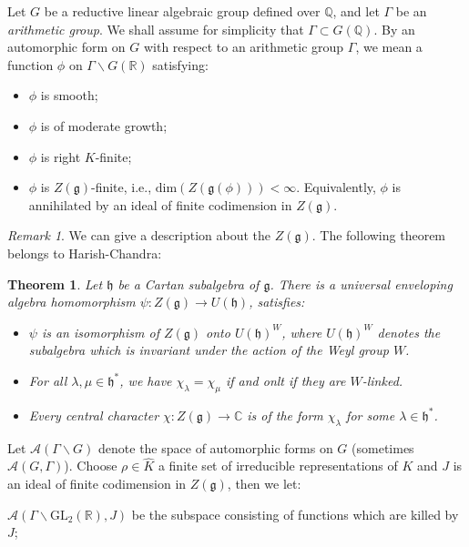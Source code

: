 \documentclass[11pt,english]{smfart}
\newtheorem{theorem}{Theorem}
\theoremstyle{definition}
\theoremstyle{remark}
\newtheorem*{remark}{Remark}
\begin{document}
Let $ G $ be a reductive linear algebraic group defined over $\mathbb{Q}$, and let $ \Gamma $ be an \textit{arithmetic group}. We shall assume for simplicity that $ \Gamma \subset G(\mathbb{Q}) $.
By an automorphic form on $ G $ with respect to an arithmetic group $ \Gamma $, we mean a function $ \phi $ on $ \Gamma \backslash G(\mathbb{R}) $ satisfying:
\begin{itemize}
    \item $\phi $ is smooth;
    \item $ \phi $ is of moderate growth;
    \item $ \phi $ is right $ K $-finite;
    \item $ \phi $ is $ Z(\mathfrak{g}) $-finite, i.e., $\mathrm{dim}(Z(\mathfrak{g}(\phi))) < \infty$. Equivalently, $\phi$ is annihilated by an ideal of finite codimension in $Z(\mathfrak{g})$.
\end{itemize}
\begin{remark}
    We can give a description about the $Z(\mathfrak{g})$. The following theorem belongs to Harish-Chandra:
    \begin{theorem}
        Let $\mathfrak{h}$ be a Cartan subalgebra of $\mathfrak{g}$. There is a universal enveloping algebra homomorphism $ \psi: Z(\mathfrak{g}) \rightarrow U(\mathfrak{h}) $, satisfies:
        \begin{itemize}
            \item $ \psi $ is an isomorphism of $ Z(\mathfrak{g}) $ onto $ U(\mathfrak{h})^{W} $, where $ U(\mathfrak{h})^{W} $ denotes the subalgebra which is invariant under the action of the Weyl group $W$.
            \item For all $ \lambda, \mu \in \mathfrak{h}^{*} $, we have $ \chi_{\lambda}=\chi_{\mu} $ if and onlt if they are $ W $-linked.
            \item Every central character $ \chi: Z(\mathfrak{g}) \rightarrow \mathbb{C} $ is of the form $ \chi_{\lambda} $ for some $ \lambda \in \mathfrak{h}^{*} $.
        \end{itemize}
        \end{theorem}
\end{remark}
Let $\mathcal{A}(\Gamma \backslash G)$ denote the space of automorphic forms on $G$ (sometimes $\mathcal{A}(G ,\Gamma)$). Choose $\rho \in \widehat {K}$ a finite set of irreducible representations of $K$ and $J$ is an ideal of finite codimension in $Z(\mathfrak{g})$, then we let:

$\mathcal{A}(\Gamma \backslash \mathrm{GL_2}(\mathbb{R}),J)$ be the subspace consisting of functions which are killed by $J$;
\end{document}
